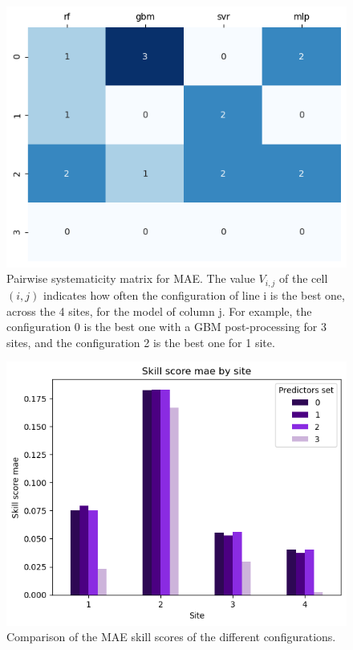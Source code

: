 \begin{figure}[htb!]
    \centering
    \includegraphics[width=\columnwidth]{figures/first_study/comp_predictors_mae.png}
\caption{Pairwise systematicity matrix for MAE. The value $V_{i,j}$ of the cell $(i,j)$ indicates how often the configuration of line i is the best one, across the 4 sites, for the model of column j. For example, the configuration 0 is the best one with a GBM post-processing for 3 sites, and the configuration 2 is the best one for 1 site.}
\end{figure}

\begin{figure}[htb!]
    \centering
    \includegraphics[width=\columnwidth]{figures/first_study/comp_predictors_mae_svr.png}
\caption{Comparison of the MAE skill scores of the different configurations.}
\end{figure}

